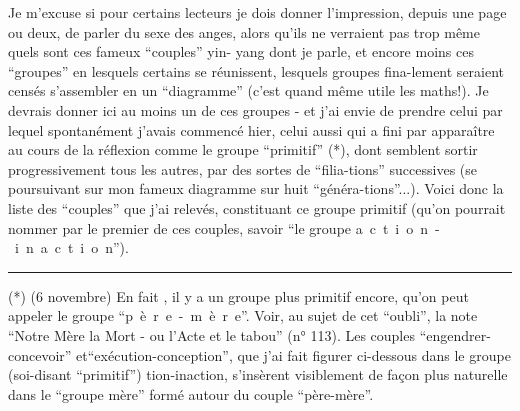 Je m'excuse si pour certains lecteurs je dois donner l'impression, depuis une page ou deux, de parler du sexe des anges, alors qu'ils ne verraient pas trop même quels sont ces fameux ``couples'' yin- yang dont je parle, et encore moins ces ``groupes'' en lesquels certains se réunissent, lesquels groupes fina-\linebreak lement seraient censés s'assembler en un ``diagramme'' (c'est quand même utile les maths!). Je devrais donner ici au moins un de ces groupes - et j'ai envie de prendre celui par lequel spontanément j'avais commencé hier, celui aussi qui a fini par apparaître au cours de la réflexion comme le groupe ``primitif'' (*), dont semblent sortir progressivement tous les autres, par des sortes de ``filia-\linebreak tions'' successives (se poursuivant sur mon fameux diagramme sur huit ``généra-\linebreak tions''...). Voici donc la liste des ``couples'' que j'ai relevés, constituant ce groupe primitif (qu'on pourrait nommer par le premier de ces couples, savoir ``le groupe \mbox{a c t i o n - i n a c t i o n}'').
\par\noindent\rule{0.25\linewidth}{0.4pt}
(*) (6 novembre) En fait , il y a un groupe plus primitif encore, qu'on peut appeler le groupe ``\mbox{p è r e - m è r e}''. Voir, au sujet de cet ``oubli'', la note ``Notre Mère la Mort - ou l'Acte et le tabou'' (n° 113). Les couples ``engendrer-concevoir'' et``exécution-conception'', que j'ai fait figurer ci-dessous dans le groupe (soi-disant ``primitif'') tion-inaction, s'insèrent visiblement de façon plus naturelle dans le ``groupe mère'' formé autour du couple ``père-mère''.
